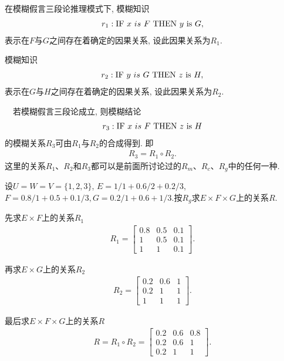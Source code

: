 在模糊假言三段论推理模式下, 模糊知识
\begin{align*}
    r_1:  \textup{IF}\,\,   x \,\, is \,\, F \,\, \textup{THEN}\,\,   y\,\,  \textup{is} \,\,G,
\end{align*}
表示在$F$与$G$之间存在着确定的因果关系, 设此因果关系为$R_1$.

模糊知识
\begin{align*}
   r_2:  \textup{IF}\,\,   y \,\, is \,\, G \,\, \textup{THEN}\,\,   z\,\,  \textup{is} \,\, H,
\end{align*}
表示在$G$与$H$之间存在着确定的因果关系, 设此因果关系为$R_2$.

　若模糊假言三段论成立, 则模糊结论
\begin{align*}
    r_3:  \textup{IF}\,\,   x \,\, is \,\, F \,\, \textup{THEN}\,\,   z\,\,  \textup{is} \,\, H
\end{align*}
的模糊关系$R_3$可由$R_1$与$R_2$的合成得到. 即
\begin{align*}
    R_3=R_1\circ R_2.
\end{align*}
这里的关系$R_1$、$R_2$和$R_3$都可以是前面所讨论过的$R_m$、$R_c$、$R_g$中的任何一种.

\begin{example}
  设$U=W=V=\{1, 2, 3\}$, $E=1/1+0.6/2+0.2/3$, $F=0.8/1+0.5+0.1/3, G=0.2/1+0.6+1/3$.按$R_g$求$E\times F\times G$上的关系$R$.
\end{example}
\begin{result}
    先求$E\times F$上的关系$R_1$
\begin{align*}
    R_{1}=\left[
    \begin{array}{ccc}
     {0.8} & {0.5} & {0.1} \\
     {1} & {0.5} & {0.1} \\
     {1} & {1} & {0.1}
    \end{array}
    \right].
\end{align*}

再求$E\times G$上的关系$R_2$
\begin{align*}
    R_{2}=\left[
    \begin{array}{ccc}
        {0.2} & {0.6} & {1} \\ {0.2} & {1} & {1} \\ {1} & {1} & {1}
    \end{array}\right].
\end{align*}

最后求$E\times F\times G$上的关系$R$
\begin{align*}
    R=R_{1} \circ R_{2}=\left[
    \begin{array}{ccc}
        {0.2} & {0.6} & {0.8} \\ {0.2} & {0.6} & {1} \\ {0.2} & {1} & {1}
    \end{array}\right].
\end{align*}
\end{result}
